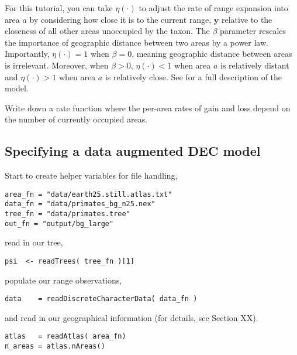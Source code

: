 For this tutorial, you can take $\eta(\cdot)$ to adjust the rate of range expansion into area $a$ by considering how close it is to the current range, $\textbf{y}$ relative to the closeness of all other areas unoccupied by the taxon.
The $\beta$ parameter rescales the importance of geographic distance between two areas by a power law.
Importantly, $\eta(\cdot) = 1$ when $\beta=0$, meaning geographic distance between areas is irrelevant.
Moreover, when $\beta > 0$, $\eta(\cdot) < 1$ when area $a$ is relatively distant and $\eta(\cdot) > 1$ when area $a$ is relatively close.
See \citet{landis13} for a full description of the model.

{\bf {}} Write down a rate function where the per-area rates of gain and loss depend on the number of currently occupied areas.

\subsection{Specifying a data augmented DEC model}


Start to create helper variables for file handling,

\begin{snugshade}
\begin{lstlisting}
area_fn = "data/earth25.still.atlas.txt"
data_fn = "data/primates_bg_n25.nex"
tree_fn = "data/primates.tree"
out_fn = "output/bg_large"
\end{lstlisting}
\end{snugshade}

read in our tree,

\begin{snugshade}
\begin{lstlisting}
psi  <- readTrees( tree_fn )[1]
\end{lstlisting}
\end{snugshade}

populate our range observations,

\begin{snugshade}
\begin{lstlisting}
data    = readDiscreteCharacterData( data_fn )
\end{lstlisting}
\end{snugshade}

and read in our geographical information (for details, see Section XX).

\begin{snugshade}
\begin{lstlisting}
atlas   = readAtlas( area_fn)
n_areas = atlas.nAreas()
\end{lstlisting}
\end{snugshade}

